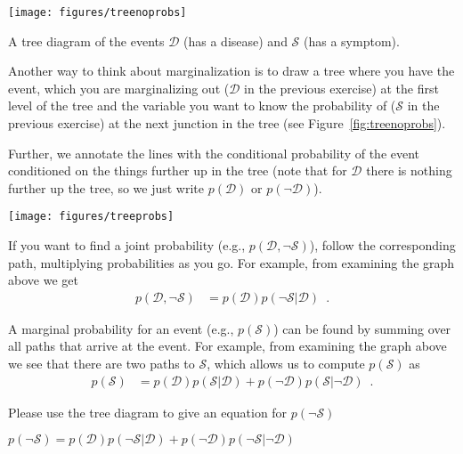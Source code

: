 \documentclass[assignment01_Solutions]{subfiles}
\begin{document}
\begin{marginfigure}
\texttt{[image: figures/treenoprobs]}
\caption{A tree diagram of the events $\mathcal{D}$ (has a disease) and $\mathcal{S}$ (has a symptom).\label{fig:treenoprobs}}
\end{marginfigure}
Another way to think about marginalization is to draw a tree where you have the event, which you are marginalizing out ($\mathcal{D}$ in the previous exercise) at the first level of the tree and the variable you want to know the probability of ($\mathcal{S}$ in the previous exercise) at the next junction in the tree (see Figure~\ref{fig:treenoprobs}).


Further, we annotate the lines with the conditional probability of the event conditioned on the things further up in the tree (note that for $\mathcal{D}$ there is nothing further up the tree, so we just write $p(\mathcal{D})$ or $p(\neg \mathcal{D})$).

\begin{center}
\texttt{[image: figures/treeprobs]}
\end{center}

If you want to find a joint probability (e.g., $p(\mathcal{D}, \neg \mathcal{S})$), follow the corresponding path, multiplying probabilities as you go.  For example, from examining the graph above we get
\begin{align}
p(\mathcal{D}, \neg \mathcal{S}) &= p(\mathcal{D}) p(\neg \mathcal{S}|\mathcal{D}) \enspace .
\end{align}

A marginal probability for an event (e.g., $p(\mathcal{S})$) can be found by summing over all paths that arrive at the event.  For example, from examining the graph above we see that there are two paths to $\mathcal{S}$, which allows us to compute $p(\mathcal{S})$ as
\begin{align}
p(\mathcal{S}) &= p(\mathcal{D}) p(\mathcal{S}|\mathcal{D}) + p(\neg \mathcal{D}) p(\mathcal{S}|\neg \mathcal{D})  \enspace .
\end{align}


\begin{exercise}[(10 minutes)]
Please use the tree diagram to give an equation for $p(\neg \mathcal{S})$
\begin{boxedsolution}
 $p(\neg \mathcal{S}) =  p(\mathcal{D}) p( \neg \mathcal{S}|\mathcal{D}) + p(\neg \mathcal{D}) p(\neg \mathcal{S}|\neg \mathcal{D}) $
\end{boxedsolution}
\end{exercise}
\end{document}
